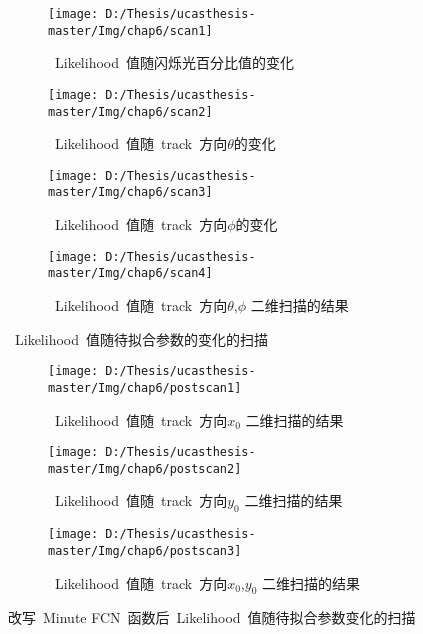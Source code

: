 \begin{figure}[!htbp]
  \centering
  \begin{subfigure}[b]{\MySubFactor\textwidth}
    \texttt{[image: D:/Thesis/ucasthesis-master/Img/chap6/scan1]}
    \caption{~Likelihood~值随闪烁光百分比值的变化}
    \label{fig:scan_1}
  \end{subfigure}%
  \quad\quad\quad\quad\quad\quad%
  \begin{subfigure}[b]{\MySubFactor\textwidth}
    \texttt{[image: D:/Thesis/ucasthesis-master/Img/chap6/scan2]}
    \caption{~Likelihood~值随~track~方向$\theta$的变化 }
    \label{fig:scan_2}
  \end{subfigure}
   \begin{subfigure}[b]{\MySubFactor\textwidth}
    \texttt{[image: D:/Thesis/ucasthesis-master/Img/chap6/scan3]}
    \caption{~Likelihood~值随~track~方向$\phi$的变化  }
    \label{fig:scan_3}
  \end{subfigure}%
  \quad\quad\quad\quad\quad\quad%
  \begin{subfigure}[b]{\MySubFactor\textwidth}
    \texttt{[image: D:/Thesis/ucasthesis-master/Img/chap6/scan4]}
    \caption{~Likelihood~值随~track~方向$\theta$,$\phi$ 二维扫描的结果}
    \label{fig:scan_4}
  \end{subfigure}
  \caption{~Likelihood~值随待拟合参数的变化的扫描 }
  \label{fig:scan}
\end{figure}
\begin{figure}[!htbp]
  \centering
  \begin{subfigure}[b]{\MySubFactor\textwidth}
    \texttt{[image: D:/Thesis/ucasthesis-master/Img/chap6/postscan1]}
    \caption{ ~Likelihood~值随~track~方向$x_0$ 二维扫描的结果 }
    \label{fig:postscan_1}
  \end{subfigure}%
  \quad\quad\quad\quad\quad\quad%
  \begin{subfigure}[b]{\MySubFactor\textwidth}
    \texttt{[image: D:/Thesis/ucasthesis-master/Img/chap6/postscan2]}
    \caption{ ~Likelihood~值随~track~方向$y_0$ 二维扫描的结果  }
    \label{fig:postscan_2}
  \end{subfigure}
   \begin{subfigure}[b]{\MySubFactor\textwidth}
    \texttt{[image: D:/Thesis/ucasthesis-master/Img/chap6/postscan3]}
    \caption{ ~Likelihood~值随~track~方向$x_0$,$y_0$ 二维扫描的结果 }
    \label{fig:postscan_3}
  \end{subfigure}%
  \caption{改写~Minute FCN~函数后~Likelihood~值随待拟合参数变化的扫描 }
  \label{fig:postscan}
\end{figure}
